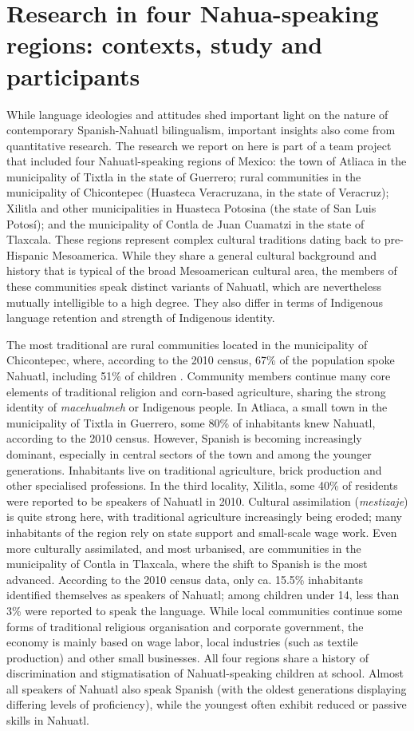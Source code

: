 \documentclass[output=paper,hidelinks]{langscibook}
\begin{document}
\section{Research in four Nahua-speaking regions: contexts, study and participants}

While language ideologies and attitudes shed important light on the nature of contemporary Spanish-Nahuatl bilingualism, important insights also come from quantitative research. The research we report on here is part of a team project that included four Nahuatl-speaking regions of Mexico: the town of Atliaca in the municipality of Tixtla in the state of Guerrero; rural communities in the municipality of Chicontepec (Huasteca Veracruzana, in the state of Veracruz); Xilitla and other municipalities in Huasteca Potosina (the state of San Luis Potosí); and the municipality of Contla de Juan Cuamatzi in the state of Tlaxcala. These regions represent complex cultural traditions dating back to pre-Hispanic Mesoamerica. While they share a general cultural background and history that is typical of the broad Mesoamerican cultural area, the members of these communities speak distinct variants of Nahuatl, which are nevertheless mutually intelligible to a high degree. They also differ in terms of Indigenous language retention and strength of Indigenous identity.

The most traditional are rural communities located in the municipality of Chicontepec, where, according to the 2010 census, 67\% of the population spoke Nahuatl, including 51\% of children \citep{inegi2010}. Community members continue many core elements of traditional religion and corn-based agriculture, sharing the strong identity of \textit{macehualmeh} or Indigenous people. In Atliaca, a small town in the municipality of Tixtla in Guerrero, some 80\% of inhabitants knew Nahuatl, according to the 2010 census. However, Spanish is becoming increasingly dominant, especially in central sectors of the town and among the younger generations. Inhabitants live on traditional agriculture, brick production and other specialised professions. In the third locality, Xilitla, some 40\% of residents were reported to be speakers of Nahuatl in 2010. Cultural assimilation (\textit{mestizaje}) is quite strong here, with traditional agriculture increasingly being eroded; many inhabitants of the region rely on state support and small-scale wage work. Even more culturally assimilated, and most urbanised, are communities in the municipality of Contla in Tlaxcala, where the shift to Spanish is the most advanced. According to the 2010 census data, only ca. 15.5\% inhabitants identified themselves as speakers of Nahuatl; among children under 14, less than 3\% were reported to speak the language. While local communities continue some forms of traditional religious organisation and corporate government, the economy is mainly based on wage labor, local industries (such as textile production) and other small businesses. All four regions share a history of discrimination and stigmatisation of Nahuatl-speaking children at school. Almost all speakers of Nahuatl also speak Spanish (with the oldest generations displaying differing levels of proficiency), while the youngest often exhibit reduced or passive skills in Nahuatl.
\end{document}

